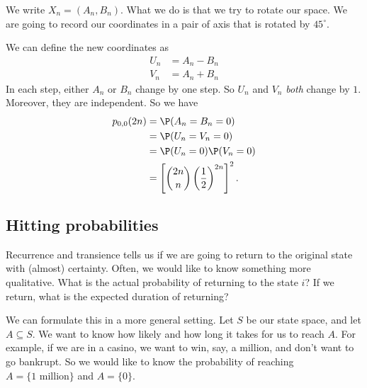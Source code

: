 \documentclass[a4paper]{article}
\begin{document}
We write $X_n = (A_n, B_n)$. What we do is that we try to rotate our space. We are going to record our coordinates in a pair of axis that is rotated by $45^\circ$.
\begin{center}
\end{center}
We can define the new coordinates as
\begin{align*}
  U_n &= A_n - B_n\\
  V_n &= A_n + B_n
\end{align*}
In each step, either $A_n$ or $B_n$ change by one step. So $U_n$ and $V_n$ \emph{both} change by $1$. Moreover, they are independent. So we have
\begin{align*}
  p_{0, 0}(2n) &= \P(A_n = B_n = 0)\\
  &= \P(U_n = V_n = 0)\\
  &= \P(U_n = 0)\P (V_n = 0)\\
  &= \left[\binom{2n}{n}\left(\frac{1}{2}\right)^{2n}\right]^2.
\end{align*}
\subsection{Hitting probabilities}
Recurrence and transience tells us if we are going to return to the original state with (almost) certainty. Often, we would like to know something more qualitative. What is the actual probability of returning to the state $i$? If we return, what is the expected duration of returning?

We can formulate this in a more general setting. Let $S$ be our state space, and let $A \subseteq S$. We want to know how likely and how long it takes for us to reach $A$. For example, if we are in a casino, we want to win, say, a million, and don't want to go bankrupt. So we would like to know the probability of reaching $A = \{1\text{ million}\}$ and $A = \{0\}$.
\end{document}
